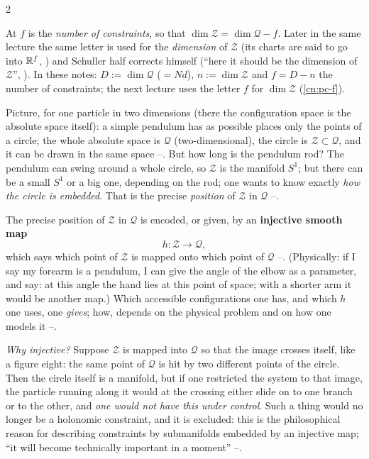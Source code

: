 \begin{paracol}{2}
\begin{coursenote}\label{cn:zw-f}
At  $f$ is the \emph{number of constraints}, so that $\dim\mathcal Z=\dim\mathcal Q-f$. Later in the same lecture the same letter is used for the \emph{dimension} of $\mathcal Z$ (its charts are said to go into $\mathbb{R}^f$, ) and Schuller half corrects himself (``here it should be the dimension of $\mathcal Z$'', ). In these notes: $D:=\dim\mathcal Q$ ($=Nd$), $n:=\dim\mathcal Z$ and $f=D-n$ the number of constraints; the next lecture uses the letter $f$ for $\dim\mathcal Z$ (\cref{cn:pc-f}).
\end{coursenote}

Picture, for one particle in two dimensions (there the configuration space is the absolute space itself): a simple pendulum has as possible places only the points of a circle; the whole absolute space is $\mathcal Q$ (two-dimensional), the circle is $\mathcal Z\subset\mathcal Q$, and it can be drawn in the same space --. But how long is the pendulum rod? The pendulum can swing around a whole circle, so $\mathcal Z$ is the manifold $S^1$; but there can be a small $S^1$ or a big one, depending on the rod; one wants to know exactly \emph{how the circle is embedded}. That is the precise \emph{position} of $\mathcal Z$ in $\mathcal Q$ --.

\begin{definition}\label{def:zw-h}
The precise position of $\mathcal Z$ in $\mathcal Q$ is encoded, or given, by an \textbf{injective smooth map}
\[
  h\colon\mathcal Z\to\mathcal Q ,
\]
which says which point of $\mathcal Z$ is mapped onto which point of $\mathcal Q$ --. (Physically: if I say my forearm is a pendulum, I can give the angle of the elbow as a parameter, and say: at this angle the hand lies at this point of space; with a shorter arm it would be another map.) Which accessible configurations one has, and which $h$ one uses, one \emph{gives}; how, depends on the physical problem and on how one models it --.
\end{definition}

\emph{Why injective?} Suppose $\mathcal Z$ is mapped into $\mathcal Q$ so that the image crosses itself, like a figure eight: the same point of $\mathcal Q$ is hit by two different points of the circle. Then the circle itself is a manifold, but if one restricted the system to that image, the particle running along it would at the crossing either slide on to one branch or to the other, and \emph{one would not have this under control}. Such a thing would no longer be a holonomic constraint, and it is excluded: this is the philosophical reason for describing constraints by submanifolds embedded by an injective map; ``it will become technically important in a moment'' --.


\end{paracol}
